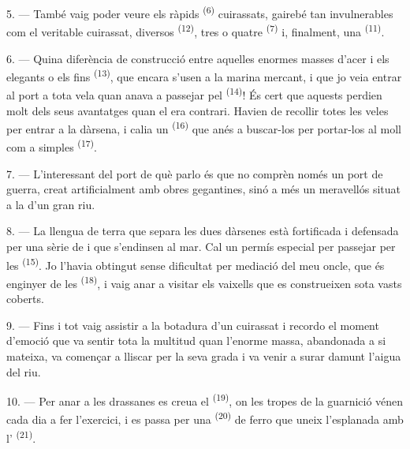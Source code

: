 5. --- També vaig poder veure els ràpids  \textsuperscript{(6)}
cuirassats, gairebé tan invulnerables com el veritable cuirassat, diversos
 \textsuperscript{(12)}, tres o quatre 
\textsuperscript{(7)} i, finalment, una  \textsuperscript{(11)}.

6. --- Quina diferència de construcció entre aquelles enormes masses d'acer i els
elegants  o els fins 
\textsuperscript{(13)}, que encara s'usen a la marina mercant, i que jo veia
entrar al port a tota vela quan anava a passejar pel 
\textsuperscript{(14)}! És cert que aquests perdien molt dels seus avantatges quan
el  era contrari. Havien de recollir totes les veles per entrar a la
dàrsena, i calia un  \textsuperscript{(16)} que anés a
buscar-los per portar-los al moll com a simples 
\textsuperscript{(17)}.

\VUsaut{3.0mm}
\VUsaut{3.0mm}

7. --- L'interessant del port de què parlo és que no comprèn només un port de
guerra, creat artificialment amb obres gegantines, sinó a més un meravellós
 situat a la  d'un gran riu.

8. --- La llengua de terra que separa les dues dàrsenes està fortificada i
defensada per una sèrie de  i  que
s'endinsen al mar. Cal un permís especial per passejar per les 
\textsuperscript{(15)}. Jo l'havia obtingut sense dificultat per mediació del meu
oncle, que és enginyer de les  \textsuperscript{(18)}, i vaig
anar a visitar els vaixells que es construeixen sota vasts coberts.

9. --- Fins i tot vaig assistir a la botadura d'un cuirassat i recordo el moment
d'emoció que va sentir tota la multitud quan l'enorme massa, abandonada a si
mateixa, va començar a lliscar per la seva grada i va venir a surar damunt
l'aigua del riu.

10. --- Per anar a les drassanes es creua el 
\textsuperscript{(19)}, on les tropes de la guarnició vénen cada dia a fer
l'exercici, i es passa per una  \textsuperscript{(20)} de ferro
que uneix l'esplanada amb l' \textsuperscript{(21)}.

